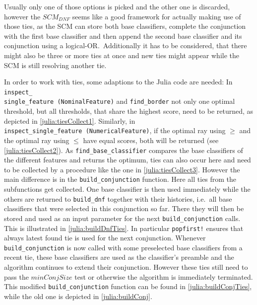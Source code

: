 Usually only one of those options is picked and the other one is discarded, however the \(SCM_{DNF}\)
seems like a good framework for actually making use of those ties, as the SCM can
store both base classifiers, complete the conjunction with the first base classifier and then append the second base classifier and its conjunction using a logical-OR.\
Additionally it has to be considered, that there might also be three or more ties at once and new ties might appear
while the SCM is still resolving another tie.

In order to work with ties, some adaptions to the Julia code are needed:
In \texttt{inspect\_\\single\_feature\ (NominalFeature)} and \texttt{find\_border} not only one optimal threshold, but all thresholds,
that share the highest score, need to be returned, as depicted in \autoref{julia:tiesCollect1}.
Similarly, in \texttt{inspect\_single\_feature\ (NumericalFeature)}, if the optimal ray using \(\geq\)
and the optimal ray using \(\leq\) have equal scores, both will be returned (see \autoref{julia:tiesCollect2}).
As \texttt{find\_base\_classifier} compares the base classifiers of the different features and returns the optimum, ties can also occur here
and need to be collected by a procedure like the one in \autoref{julia:tiesCollect3}.
However the main difference is in the \texttt{build\_conjunction} function.
Here all ties from the subfunctions get collected.
One base classifier is then used immediately while the others are returned to \texttt{build\_dnf} together with their
histories, i.e.\ all base classifiers that were selected in this conjunction so far.
There they will then be stored and used as an input parameter for the next \texttt{build\_conjunction} calls.
This is illustrated in \autoref{julia:buildDnfTies}.
In particular \texttt{popfirst!} ensures that always latest found tie is used for the next conjunction.
Whenever \texttt{build\_conjunction} is now called with some preselected base classifiers from a recent tie,
these base classifiers are used as the classifier's preamble and the algorithm continues to extend their conjunction.
However these ties still need to pass the \(minConjSize\) test or otherwise the algorithm is immediately terminated.
This modified \texttt{build\_conjunction} function can be found in \autoref{julia:buildConjTies}, while the old one is depicted in \autoref{julia:buildConj}.

